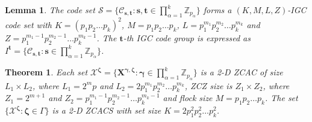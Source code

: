 \documentclass[10pt,a4paper]{amsart}
\theoremstyle{plain}
\newtheorem{lemma}{Lemma}
\newtheorem{theorem}{Theorem}
\begin{document}
\setcounter{lemma}{4}
	\begin{lemma}\label{Thm_IGC_gen}
		The code set $\mathcal{S} = \{ \mathcal{C}_{\mathbf{s}, \mathbf{t}}: \mathbf{s}, \mathbf{t} \in \prod_{\alpha=1}^{k} \mathbb{Z}_{p_\alpha}\}$  forms a $(K,M, L,Z)$-IGC code set with $K= (p_1 p_2 \dots p_k)^2$, $M= p_1 p_2 \dots p_k$, $L= p_1^{m_1} p_2^{m_2} \dots p_k^{m_k}$ and $Z= p_1^{m_1-1} p_2^{m_2-1} \dots p_k^{m_k-1}$. The $\mathbf{t}$-th IGC code group is expressed as $I^{\mathbf{t}} = \{ \mathcal{C}_{\mathbf{s}, \mathbf{t}}: \mathbf{s} \in \prod_{\alpha=1}^{k} \mathbb{Z}_{p_\alpha}\}$.
	\end{lemma}	

	\begin{theorem}\label{thm_ZCACS}
		Each set $\mathcal{X}^{\bm{\zeta}}= \{\mathbf{X}^{\bm{\gamma},\bm{\zeta}}: \bm{\gamma} \in \prod_{\alpha=1}^{k} \mathbb{Z}_{p_\alpha}\}$ is a 2-D ZCAC of size  $L_1 \times L_2$, where $L_1= 2^m p$ and $L_2= 2 p_1^{m_1} p_2^{m_2} \dots p_k^{m_k}$, ZCZ size is $Z_1 \times Z_2$,  where $Z_1= 2^{m+1} $ and $Z_2=  p_1^{m_1-1} p_2^{m_2-1} \dots p_k^{m_k-1}$ and flock size $M= p_1 p_2 \dots p_k$. The set $\{ \mathcal{X}^{\bm{\zeta}}: \bm{\zeta} \in \Gamma\}$ is a 2-D ZCACS with set size $K= 2p_1^2 p_2^2 \dots p_k^2$.
	\end{theorem} 
\end{document}
